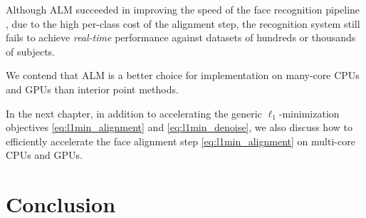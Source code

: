 Although ALM succeeded in improving the speed of the face recognition pipeline
\cite{WagnerA2011-PAMI}, due to the high per-class cost of the alignment step,
the recognition system still fails to achieve \emph{real-time} performance
against datasets of hundreds or thousands of subjects.  

We contend that ALM is a better choice for implementation on many-core CPUs and
GPUs than interior point methods. 

In the next chapter,
in addition to accelerating the generic
$\ell_1$-minimization objectives \eqref{eq:l1min_alignment} and \eqref{eq:l1min_denoise}, we 
also discuss how to efficiently accelerate the face alignment step
\eqref{eq:l1min_alignment} on multi-core CPUs and GPUs.



%

%


%

\section{Conclusion}


